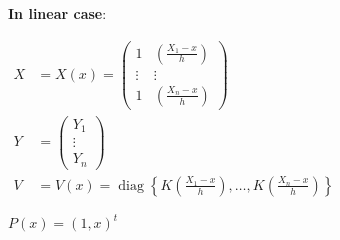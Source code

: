 \documentclass[11pt, oneside]{article}   	%
\begin{document}
\textbf{In linear case}:


$\begin{aligned} X & =X(x)=\left(\begin{array}{cccc}1 & \left(\frac{X_1-x}{h}\right) \\ \vdots & \vdots \\ 1 & \left(\frac{X_n-x}{h}\right) \end{array}\right)\\
Y & = \left(\begin{array}{c}Y_1 \\ \vdots \\ Y_n\end{array}\right)\\
V & =V(x)=\operatorname{diag}\left\{K\left(\frac{X_1-x}{h}\right), \ldots, K\left(\frac{X_n-x}{h}\right)\right\}\end{aligned}$

$P(x)=\left(1, x\right)^t$\\
\end{document}
